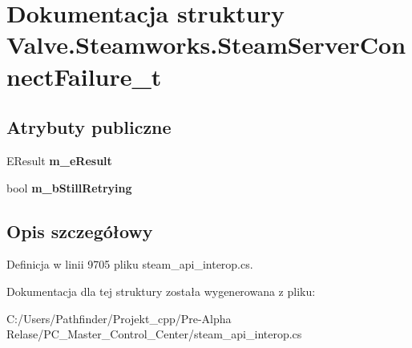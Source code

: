 \hypertarget{struct_valve_1_1_steamworks_1_1_steam_server_connect_failure__t}{}\section{Dokumentacja struktury Valve.\+Steamworks.\+Steam\+Server\+Connect\+Failure\+\_\+t}
\label{struct_valve_1_1_steamworks_1_1_steam_server_connect_failure__t}
\subsection*{Atrybuty publiczne}
\begin{DoxyCompactItemize}
\item 
\mbox{\label{struct_valve_1_1_steamworks_1_1_steam_server_connect_failure__t_aff071b57bda4090c282087b44773b483}} 
E\+Result {\bfseries m\+\_\+e\+Result}
\item 
\mbox{\label{struct_valve_1_1_steamworks_1_1_steam_server_connect_failure__t_ac97bde4e2b451b03f684442dfd3f938c}} 
bool {\bfseries m\+\_\+b\+Still\+Retrying}
\end{DoxyCompactItemize}


\subsection{Opis szczegółowy}


Definicja w linii 9705 pliku steam\+\_\+api\+\_\+interop.\+cs.



Dokumentacja dla tej struktury została wygenerowana z pliku\+:\begin{DoxyCompactItemize}
\item 
C\+:/\+Users/\+Pathfinder/\+Projekt\+\_\+cpp/\+Pre-\/\+Alpha Relase/\+P\+C\+\_\+\+Master\+\_\+\+Control\+\_\+\+Center/steam\+\_\+api\+\_\+interop.\+cs\end{DoxyCompactItemize}
